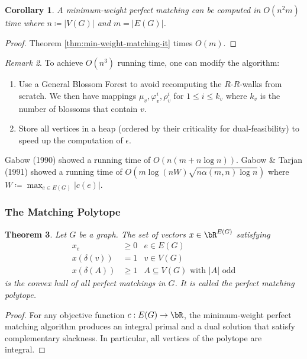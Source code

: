 \documentclass[11pt, a4paper]{article}
\newcommand{\abs}[1]{\left\lvert#1\right\rvert}
\newtheorem{theorem}{Theorem}[section]
\newtheorem{cor}[theorem]{Corollary}
\theoremstyle{remark}
\newtheorem{remark}[theorem]{Remark}
\theoremstyle{definition}
\begin{document}
\begin{cor}
	A minimum-weight perfect matching can be computed in $O(n^2m)$ time
	where $n\coloneqq\abs{V(G)}$ and $m=\abs{E(G)}$.
\end{cor}
\begin{proof}
	Theorem \ref{thm:min-weight-matching-it} times $O(m)$.
\end{proof}

\begin{remark}
	To achieve $O(n^3)$ running time, one can modify the algorithm:
	\begin{enumerate}
		\item Use a General Blossom Forest to avoid recomputing the $R$-$R$-walks
		from scratch. We then have mappings $\mu_v,\varphi_v^i,\rho_v^i$ for
		$1\leq i\leq k_v$ where $k_v$ is the number of blossoms that contain
		$v$.

		\item Store all vertices in a heap (ordered by their criticality for
		dual-feasibility) to speed up the computation of $\epsilon$.
	\end{enumerate}
	Gabow (1990) showed a running time of $O(n(m+n\log n))$. Gabow \& Tarjan
	(1991) showed a running time of $O(m\log(nW)\sqrt{n\alpha(m,n)\log n})$
	where $W\coloneqq \max_{e\in E(G)}\abs{c(e)}$.
\end{remark}

\subsubsection{The Matching Polytope}

\begin{theorem}
	Let $G$ be a graph. The set of vectors $x\in\bR^{E(G)}$ satisfying
	\begin{align*}
		x_e          & \geq 0 & e\in E(G)                                 \\
		x(\delta(v)) & =1     & v\in V(G)                                 \\
		x(\delta(A)) & \geq 1 & A\subseteq V(G)\text{ with $\abs{A}$ odd}
	\end{align*}
	is the convex hull of all perfect matchings in $G$. It is called the \emph{perfect
		matching polytope}.
\end{theorem}
\begin{proof}
	For any objective function $c: E(G)\to\bR$, the minimum-weight perfect
	matching algorithm produces an integral primal and a dual solution that
	satisfy complementary slackness. In particular, all vertices of the
	polytope are integral.
\end{proof}
\end{document}
